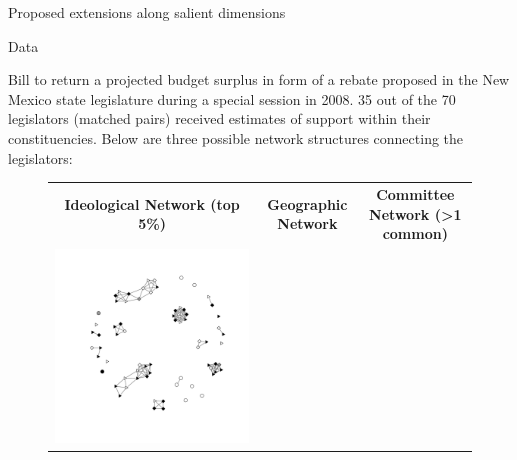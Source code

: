 \documentclass[final]{beamer}
\newlength{\onecolwid}
\newlength{\onecolwidd}
\begin{document}
\begin{frame}[t]
\begin{columns}[t]
\begin{column}{\onecolwidd}
\begin{block}{Proposed extensions along salient dimensions}
\begin{rmfamily}
	\end{rmfamily}						
	\end{block}
	
	\vspace*{10mm}
	\begin{block}{Data}
	\begin{rmfamily}
	
	Bill to return a projected budget surplus in form of a rebate proposed in the New Mexico state legislature during a special session in 2008. 35 out of the 70 legislators (matched pairs) received estimates of support within their constituencies. Below are three possible network structures connecting the legislators:
	
	\hspace{2cm}
	\begin{figure}
	\centering
	\begin{tabular}{ccc}
	{\bf Ideological Network (top 5\%)} & {\bf Geographic Network} & {\bf Committee Network (>1 common)}\\
	\includegraphics[scale=0.8, clip=true,trim =2cm 2cm 2cm 2cm]{coppock_ideological_net.pdf} &

\end{tabular}
\end{figure}
\end{rmfamily}
\end{block}
\end{column}
\end{columns}
\end{frame}
\end{document}
